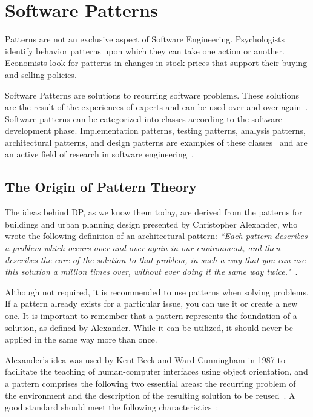\section{Software Patterns}\label{sec:software-patterns}
Patterns are not an exclusive aspect of Software Engineering. Psychologists identify behavior patterns upon which they can take one action or another. Economists look for patterns in changes in stock prices that support their buying and selling policies. 

Software Patterns are solutions to recurring software problems. These solutions are the result of the experiences of experts and can be used over and over again~\cite{Gamma1994}. Software patterns can be categorized into classes according to the software development phase. Implementation patterns, testing patterns, analysis patterns, architectural patterns, and design patterns are examples of these classes~\cite{Hamza2004} and are an active field of research in software engineering~\cite{Zhang2011, Zhang2013, Riaz2015}.

\subsection{The Origin of Pattern Theory}\label{sec:origin-pattern}
The ideas behind \ac{DP}, as we know them today, are derived from the patterns for buildings and urban planning design presented by Christopher Alexander, who wrote the following definition of an architectural pattern: 
\textit{``Each pattern describes a problem which occurs over and over again in our environment, and then describes the core of the solution to that problem, in such a way that you can use this solution a million times over, without ever doing it the same way twice."}~\cite[10]{Alexander1977}. 

Although not required, it is recommended to use patterns when solving problems. If a pattern already exists for a particular issue, you can use it or create a new one. It is important to remember that a pattern represents the foundation of a solution, as defined by Alexander. While it can be utilized, it should never be applied in the same way more than once.

Alexander’s idea was used by Kent Beck and Ward Cunningham in 1987 to facilitate the teaching of human-computer interfaces using object orientation, and a pattern comprises the following two essential areas: the recurring problem of the environment and the description of the resulting solution to be reused~\cite{Beck1987}. A good standard should meet the following characteristics~\cite{Coplien2004}:


